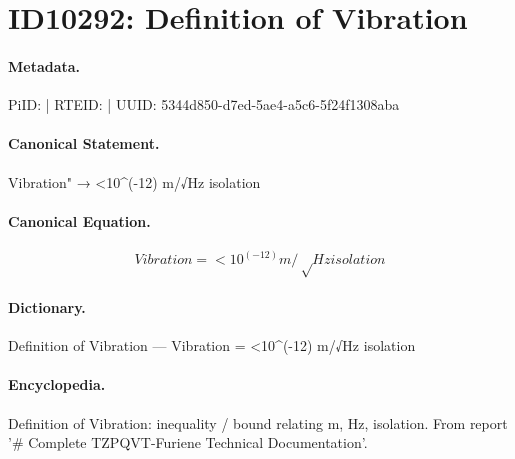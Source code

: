 \section*{ID10292: Definition of Vibration}
\paragraph{Metadata.}
PiID:  | RTEID:  | UUID: 5344d850-d7ed-5ae4-a5c6-5f24f1308aba

\paragraph{Canonical Statement.}
Vibration" → <10\textasciicircum{}(-12) m/√Hz isolation

\paragraph{Canonical Equation.}
\[
Vibration = <10^(-12) m/√Hz isolation
\]

\paragraph{Dictionary.}
Definition of Vibration — Vibration = <10\textasciicircum{}(-12) m/√Hz isolation

\paragraph{Encyclopedia.}
Definition of Vibration: inequality / bound relating m, Hz, isolation. From report '\# Complete TZPQVT-Furiene Technical Documentation'.
